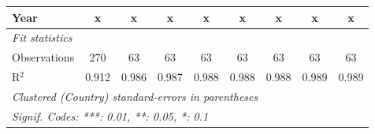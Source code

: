 \begin{table}[htbp]
\begin{tabular}{lcccccccc}
      Year                                                      & x             & x       & x       & x            & x            & x            & x            & x\\  
      \midrule \emph{Fit statistics}\\
      Observations                                              & 270           & 63      & 63      & 63           & 63           & 63           & 63           & 63\\  
      R$^2$                                                     & 0.912         & 0.986   & 0.987   & 0.988        & 0.988        & 0.988        & 0.989        & 0.989\\  
      \midrule
      \multicolumn{9}{l}{\emph{Clustered (Country) standard-errors in parentheses}}\\
      \multicolumn{9}{l}{\emph{Signif. Codes: ***: 0.01, **: 0.05, *: 0.1}}\\
   \end{tabular}
\end{table}


